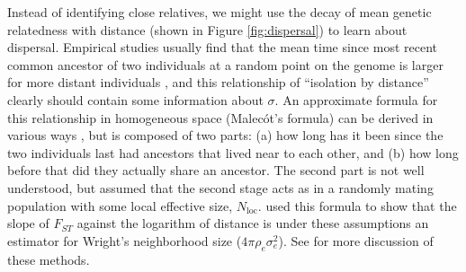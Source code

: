 \documentclass{ar-1col}
\begin{document}
Instead of identifying close relatives,
we might use the decay of mean genetic relatedness with distance 
(shown in Figure \ref{fig:dispersal}) 
to learn about dispersal.
Empirical studies usually find that
the mean time since most recent common ancestor 
of two individuals at a random point on the genome
is larger for more distant individuals \citep{sexton2013genetic,epperson2003geographical,charlesworth2003effects},
and this relationship  of ``isolation by distance'' 
clearly should contain some information about $\sigma$.
An approximate formula for this relationship
in homogeneous space (Malec\'ot's formula)
can be derived in various ways 
\citep{malecot, sawyer1976branching, barton1995genealogies, rousset_1997, barton-depaulis-etheridge, robledoarnuncio2010isolation, ringbauer2017inferring, alasadi2018estimating},
but is composed of two parts: 
(a) how long has it been since the two individuals last had ancestors that lived near to each other,
and (b) how long before that did they actually share an ancestor.
The second part is not well understood,
but \citet{malecot} assumed that the second stage acts as in a randomly mating population
with some local effective size, $N_\text{loc}$.
\citet{rousset_1997} used this formula to show that
the slope of $F_{ST}$ against the logarithm of distance
is under these assumptions an estimator for Wright's neighborhood size ($4 \pi \rho_e \sigma_e^2$).
See \citet{barton1995genealogies} for more discussion of these methods.
\end{document}
